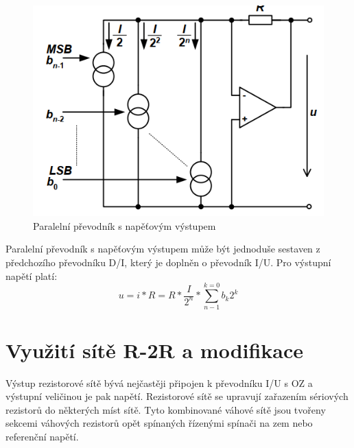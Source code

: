 \begin{figure}[h]
   \begin{center}
     \includegraphics[scale=0.6]{images/DAU.png}
   \end{center}
   \caption{Paralelní převodník s napěťovým výstupem}
\end{figure}

Paralelní převodník s napěťovým výstupem může být jednoduše sestaven z předchozího převodníku D/I, který je doplněn o převodník I/U. Pro výstupní napětí platí:
\begin{equation}
u=i*R=R*\frac{I}{2^n}*\sum_{n-1}^{k=0}b_{k}2^k
\end{equation}


\section{Využití sítě R-2R a modifikace}
Výstup rezistorové sítě bývá nejčastěji připojen k převodníku I/U s OZ a výstupní veličinou je pak napětí. Rezistorové sítě se upravují zařazením sériových rezistorů do některých míst sítě. Tyto kombinované váhové sítě jsou tvořeny sekcemi váhových rezistorů opět spínaných řízenými spínači na zem nebo referenční napětí. 
































